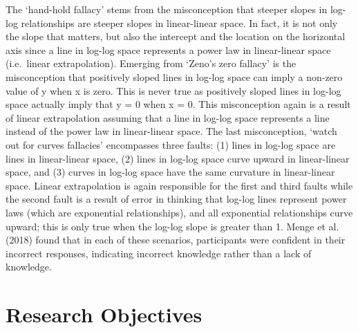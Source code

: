 \documentclass[print]{nuthesis}
\begin{document}
The `hand-hold fallacy' stems from the misconception that steeper slopes in log-log relationships are steeper slopes in linear-linear space. In fact, it is not only the slope that matters, but also the intercept and the location on the horizontal axis since a line in log-log space represents a power law in linear-linear space (i.e.~linear extrapolation).
Emerging from `Zeno's zero fallacy' is the misconception that positively sloped lines in log-log space can imply a non-zero value of y when x is zero.
This is never true as positively sloped lines in log-log space actually imply that y = 0 when x = 0. This misconception again is a result of linear extrapolation assuming that a line in log-log space represents a line instead of the power law in linear-linear space.
The last misconception, `watch out for curves fallacies' encompasses three faults: (1) lines in log-log space are lines in linear-linear space, (2) lines in log-log space curve upward in linear-linear space, and (3) curves in log-log space have the same curvature in linear-linear space.
Linear extrapolation is again responsible for the first and third faults while the second fault is a result of error in thinking that log-log lines represent power laws (which are exponential relationships), and all exponential relationships curve upward; this is only true when the log-log slope is greater than 1.
Menge et al. (2018) found that in each of these scenarios, participants were confident in their incorrect responses, indicating incorrect knowledge rather than a lack of knowledge.

\hypertarget{research-objectives}{%
\section{Research Objectives}\label{research-objectives}}
\end{document}
